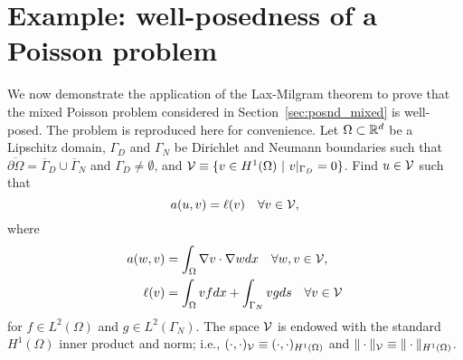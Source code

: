 \section{Example: well-posedness of a Poisson problem}
\label{eq:posnd_wellposedness_example}
We now demonstrate the application of the Lax-Milgram theorem to prove that the mixed Poisson problem considered in Section~\ref{sec:posnd_mixed} is well-posed.  The problem is reproduced here for convenience.  Let $\Omega \subset \mathbb{R}^d$ be a Lipschitz domain, $\Gamma_D$ and $\Gamma_N$ be Dirichlet and Neumann boundaries such that $\overline{\partial \Omega} = \overline{\Gamma}_D \cup \overline{\Gamma}_N$ and $\Gamma_D \neq \emptyset$, and $\calV \equiv \{ v \in H^1(\Omega) \ | \ v|_{\Gamma_D} = 0 \}$.  Find $u \in \mathcal{V}$ such that
\begin{equation*}
  a(u,v) = \ell(v) \quad \forall v \in \mathcal{V},
\end{equation*}
where
\begin{align*}
  a(w,v) &= \int_\Omega \nabla v \cdot \nabla w dx \quad \forall w,v \in \mathcal{V}, \\
  \ell(v) &= \int_\Omega v f dx + \int_{\Gamma_N} v g ds \quad \forall v \in \mathcal{V}
\end{align*}
for $f \in L^2(\Omega)$ and $g \in L^2(\Gamma_N)$.  The space $\mathcal{V}$ is endowed with the standard $H^1(\Omega)$ inner product and norm; i.e., $(\cdot,\cdot)_{\mathcal{V}} \equiv (\cdot,\cdot)_{H^1(\Omega)}$ and $\| \cdot \|_{\mathcal{V}} \equiv \| \cdot \|_{H^1(\Omega)}$.

